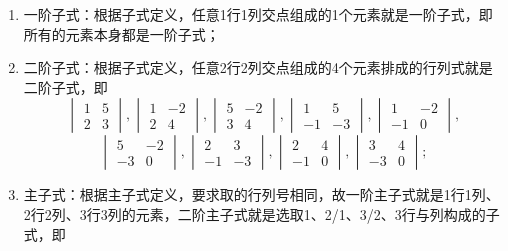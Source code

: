 \begin{solution}
    \begin{enumerate}
        \item 一阶子式：根据子式定义，任意1行1列交点组成的1个元素就是一阶子式，即所有的元素本身都是一阶子式；
        \item 二阶子式：根据子式定义，任意2行2列交点组成的4个元素排成的行列式就是二阶子式，即
              \[\begin{vmatrix}
                      1 & 5 \\
                      2 & 3
                  \end{vmatrix},\begin{vmatrix}
                      1 & -2 \\
                      2 & 4
                  \end{vmatrix},\begin{vmatrix}
                      5 & -2 \\
                      3 & 4
                  \end{vmatrix},\begin{vmatrix}
                      1 & 5 \\
                      -1 & -3
                \end{vmatrix},\begin{vmatrix}
                    1 & -2 \\
                    -1 & 0
                \end{vmatrix},\]\[\begin{vmatrix}
                    5 & -2 \\
                    -3 & 0
                \end{vmatrix},\begin{vmatrix}
                    2 & 3 \\
                    -1 & -3
                \end{vmatrix},\begin{vmatrix}
                    2 & 4 \\
                    -1 & 0
                \end{vmatrix},\begin{vmatrix}
                    3 & 4 \\
                    -3 & 0
                \end{vmatrix};\]
        \item 主子式：根据主子式定义，要求取的行列号相同，故一阶主子式就是1行1列、2行2列、3行3列的元素，二阶主子式就是选取1、2/1、3/2、3行与列构成的子式，即

\end{enumerate}
\end{solution}

